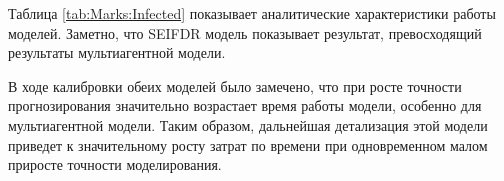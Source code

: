 Таблица \ref{tab:Marks:Infected}  показывает аналитические характеристики работы моделей. Заметно, что SEIFDR  модель показывает результат, превосходящий результаты мультиагентной модели.
\begin{table}[H]
	\caption{Аналитические результаты работы моделей. }
	\label{tab:Marks:Infected}
\end{table}

В ходе калибровки обеих моделей было замечено, что при росте точности прогнозирования значительно возрастает время работы модели, особенно для мультиагентной модели. Таким образом, дальнейшая детализация этой модели приведет к значительному росту затрат по времени при одновременном малом приросте точности моделирования. 



